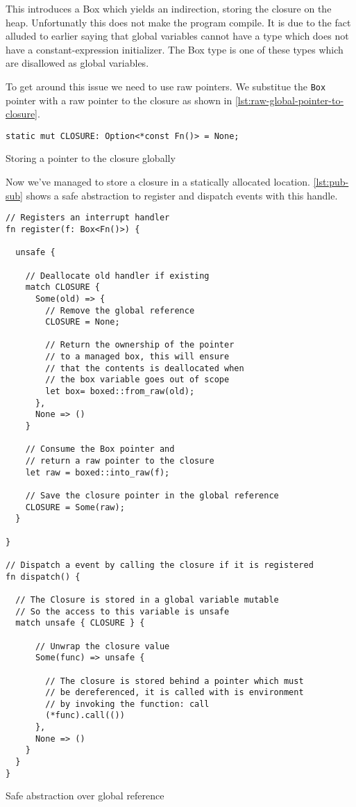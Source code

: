 This introduces a Box which yields an indirection, storing the closure on the heap.
Unfortunatly this does not make the program compile.
It is due to the fact alluded to earlier saying that global variables cannot have a type which does not have a constant-expression initializer.
The Box type is one of these types which are disallowed as global variables.

To get around this issue we need to use raw pointers.
We substitue the \texttt{Box} pointer with a raw pointer to the closure as shown in \autoref{lst:raw-global-pointer-to-closure}.

\begin{listing}[H]
  \begin{verbatim}
static mut CLOSURE: Option<*const Fn()> = None;
  \end{verbatim}
  \caption{Storing a pointer to the closure globally}
  \label{lst:raw-global-pointer-to-closure}
\end{listing}

Now we've managed to store a closure in a statically allocated location.
\autoref{lst:pub-sub} shows a safe abstraction to register and dispatch events with this handle.

\begin{listing}[H]
  \begin{verbatim}
// Registers an interrupt handler
fn register(f: Box<Fn()>) {

  unsafe {

    // Deallocate old handler if existing
    match CLOSURE {
      Some(old) => {
        // Remove the global reference
        CLOSURE = None;

        // Return the ownership of the pointer
        // to a managed box, this will ensure
        // that the contents is deallocated when
        // the box variable goes out of scope
        let box= boxed::from_raw(old);
      },
      None => ()
    }

    // Consume the Box pointer and
    // return a raw pointer to the closure
    let raw = boxed::into_raw(f);

    // Save the closure pointer in the global reference
    CLOSURE = Some(raw);
  }

}

// Dispatch a event by calling the closure if it is registered
fn dispatch() {

  // The Closure is stored in a global variable mutable
  // So the access to this variable is unsafe
  match unsafe { CLOSURE } {

      // Unwrap the closure value
      Some(func) => unsafe {

        // The closure is stored behind a pointer which must
        // be dereferenced, it is called with is environment
        // by invoking the function: call
        (*func).call(())
      },
      None => ()
    }
  }
}
  \end{verbatim}
  \caption{Safe abstraction over global reference}
  \label{lst:reg-disp}
\end{listing}

